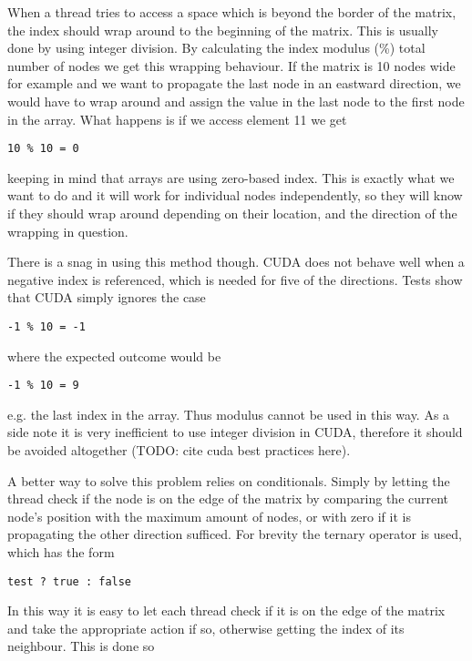 When a thread tries to access a space which is beyond the border of the matrix, the index should wrap around to the beginning of the matrix. This is usually done by using integer division. By calculating the index modulus (\%) total number of nodes we get this wrapping behaviour. If the matrix is 10 nodes wide for example and we want to propagate the last node in an eastward direction, we would have to wrap around and assign the value in the last node to the first node in the array. What happens is if we access element 11 we get

\begin{verbatim}
10 % 10 = 0
\end{verbatim}

keeping in mind that arrays are using zero-based index. This is exactly what we want to do and it will work for individual nodes independently, so they will know if they should wrap around depending on their location, and the direction of the wrapping in question. 

There is a snag in using this method though. CUDA does not behave well when a negative index is referenced, which is needed for five of the directions. Tests show that CUDA simply ignores the case

\begin{verbatim}
-1 % 10 = -1
\end{verbatim}

where the expected outcome would be

\begin{verbatim}
-1 % 10 = 9
\end{verbatim}

e.g. the last index in the array. Thus modulus cannot be used in this way. As a side note it is very inefficient to use integer division in CUDA, therefore it should be avoided altogether (TODO: cite cuda best practices here).

A better way to solve this problem relies on conditionals. Simply by letting the thread check if the node is on the edge of the matrix by comparing the current node's position with the maximum amount of nodes, or with zero if it is propagating the other direction sufficed. For brevity the ternary operator is used, which has the form

\begin{verbatim}
test ? true : false
\end{verbatim}

In this way it is easy to let each thread check if it is on the edge of the matrix and take the appropriate action if so, otherwise getting the index of its neighbour. This is done so


